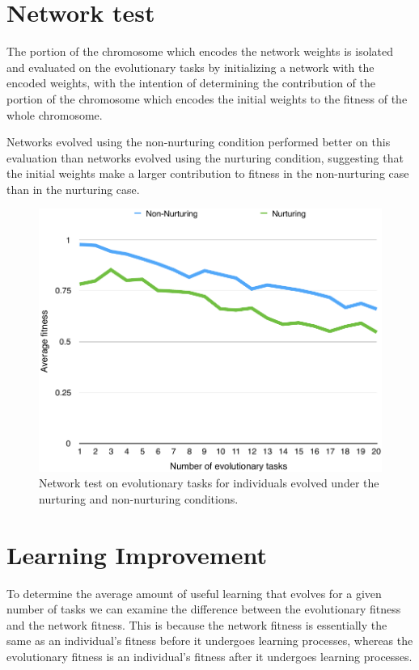 \documentclass[master]{outhesis}
\begin{document}
\section{Network test}

The portion of the chromosome which encodes the network weights is isolated and evaluated on the evolutionary tasks by initializing a network with the encoded weights, with the intention of determining the contribution of the portion of the chromosome which encodes the initial weights to the fitness of the whole chromosome.

Networks evolved using the non-nurturing condition performed better on this evaluation than networks evolved using the nurturing condition, suggesting that the initial weights make a larger contribution to fitness in the non-nurturing case than in the nurturing case.

\begin{figure}[H]
	\centering
	\includegraphics{NetworkTestPlot.pdf}
	\caption{Network test on evolutionary tasks for individuals evolved under the nurturing and non-nurturing conditions.}
\end{figure}

\section{Learning Improvement}

To determine the average amount of useful learning that evolves for a given number of tasks we can examine the difference between the evolutionary fitness and the network fitness.
This is because the network fitness is essentially the same as an individual's fitness before it undergoes learning processes, whereas the evolutionary fitness is an individual's fitness after it undergoes learning processes.
\end{document}
